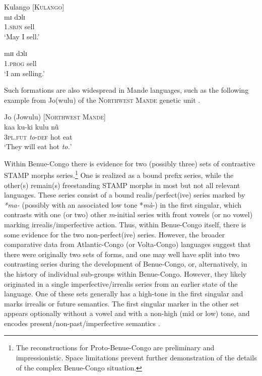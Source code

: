 \documentclass[output=paper]{langsci/langscibook}
\begin{document}
\ea\label{ex:anderson:69}
Kulango \citep[193]{Elders2007}            \textsc{[Kulango]}\\
\ea\label{ex:anderson:69a}
\gll mɪ   dɔlɪ\\
  \textsc{1.sbjn}  sell\\
\glt `May I sell.'    

\ex \label{ex:anderson:69b}
\gll   mɪɪ   dɔlɪ\\
  1.\textsc{prog}  sell\\
  \glt `I am selling.'  
\z
\z

Such formations are also widespread in Mande languages, such as the following example from Jo(wulu) of the \textsc{Northwest Mande} genetic unit .

\ea\label{ex:anderson:70}
Jo (Jowulu) \citep[11]{Kim2002}          [\textsc{Northwest Mande}]  \\
\gll kaa    ku-ki  kulu  n\~u  \\
\textsc{3pl.fut}  \textit{to}-\textsc{def}  hot  eat    \\
\glt `They will eat hot \textit{to.}'        
\z

Within Benue-Congo there is evidence for two (possibly three) sets of contrastive STAMP morphs series.\footnote{The reconstructions for Proto-Benue-Congo are preliminary and impressionistic. Space limitations prevent further demonstration of the details of the complex Benue-Congo situation.} One is realized as a bound prefix series, while the other(s) remain(s) freestanding STAMP morphs in most but not all relevant languages. These series consist of a bound realis/perfect(ive) series marked by \textit{*}\textit{ma-} (possibly with an associated low tone *\textit{mà}-) in the first singular, which contrasts with one (or two) other \textit{m}-initial series with front vowels (or no vowel) marking irrealis/imperfective action. Thus, within Benue-Congo itself, there is some evidence for the two non-perfect(ive) series. However, the broader comparative data from Atlantic-Congo (or Volta-Congo) languages suggest that there were originally two sets of forms, and one may well have split into two contrasting series during the development of Benue-Congo, or, alternatively, in the history of individual sub-groups within Benue-Congo. However, they likely originated in a single imperfective/irrealis series from an earlier state of the language. One of these sets generally has a high-tone in the first singular and marks irrealis or future semantics. The first singular marker in the other set appears optionally without a vowel and with a non-high (mid or low) tone, and encodes present/non-past/imperfective semantics .
\end{document}

